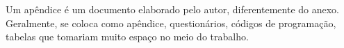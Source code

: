 \label{ap:A}

Um apêndice é um documento elaborado pelo autor, diferentemente do anexo. Geralmente, se coloca como apêndice, questionários, códigos de programação, tabelas que tomariam muito espaço no meio do trabalho.
